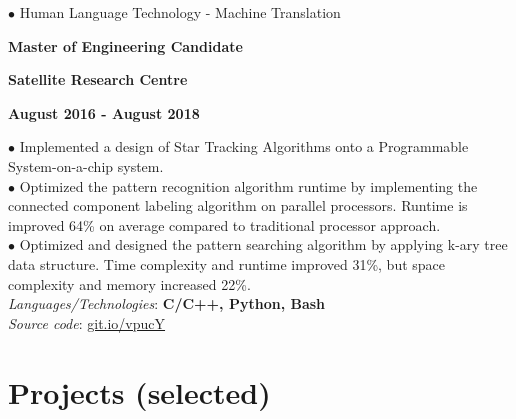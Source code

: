\documentclass[10pt]{article}
\begin{document}
        \vspace{-5mm}

        $\bullet$ {Human Language Technology - Machine Translation}


        \begin{multicols}{3}
            \begin{flushleft}
                \textbf{Master of Engineering Candidate}
            \end{flushleft}

            \columnbreak

            \begin{center}
                \textbf{Satellite Research Centre}
            \end{center}

            \columnbreak

            \begin{flushright}
                \textbf{August 2016 - August 2018}
            \end{flushright}
        \end{multicols}

        \vspace{-5mm}

        $\bullet$ {Implemented a design of Star Tracking Algorithms onto a Programmable System-on-a-chip system. }\\
        $\bullet$ {Optimized the pattern recognition algorithm runtime by implementing the connected component labeling algorithm on parallel processors. Runtime is improved 64\% on average compared to traditional processor approach.} \\
        $\bullet$ {Optimized and designed the pattern searching algorithm by applying k-ary tree data structure. Time complexity and runtime improved 31\%, but space complexity and memory increased 22\%.} \\
        \emph{Languages/Technologies}: \textbf{C/C++, Python, Bash}\\
        \emph{Source code}: \href{https://git.io/vpucY}{git.io/vpucY}


    \section{Projects (selected)}
        \vspace{-2mm}
\end{document}
